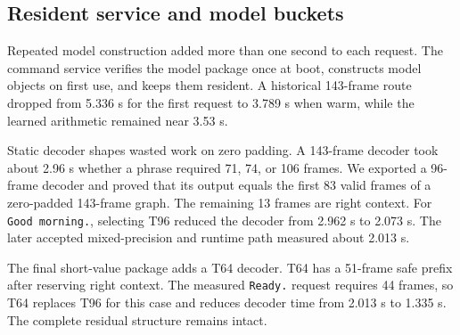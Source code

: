 \documentclass[10pt]{article}
\begin{document}
\subsection{Resident service and model buckets}

Repeated model construction added more than one second to each request. The
command service verifies the model package once at boot, constructs model
objects on first use, and keeps them resident. A historical 143-frame route
dropped from 5.336 s for the first request to 3.789 s when warm, while the
learned arithmetic remained near 3.53 s.

Static decoder shapes wasted work on zero padding. A 143-frame decoder took
about 2.96 s whether a phrase required 71, 74, or 106 frames. We exported a
96-frame decoder and proved that its output equals the first 83 valid frames
of a zero-padded 143-frame graph. The remaining 13 frames are right context.
For \texttt{Good morning.}, selecting T96 reduced the decoder from 2.962 s to
2.073 s. The later accepted mixed-precision and runtime path measured about
2.013 s.

The final short-value package adds a T64 decoder. T64 has a 51-frame safe
prefix after reserving right context. The measured \texttt{Ready.} request
requires 44 frames, so T64 replaces T96 for this case and reduces decoder time
from 2.013 s to 1.335 s. The complete residual structure remains intact.
\end{document}
